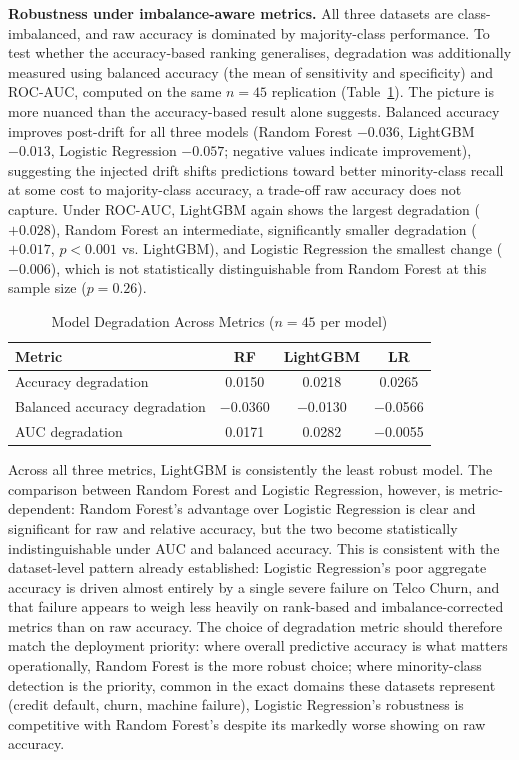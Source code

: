 \documentclass[conference]{IEEEtran}
\begin{document}
\textbf{Robustness under imbalance-aware metrics.} All three datasets are class-imbalanced, and raw accuracy is dominated by majority-class performance. To test whether the accuracy-based ranking generalises, degradation was additionally measured using balanced accuracy (the mean of sensitivity and specificity) and ROC-AUC, computed on the same $n=45$ replication (Table~\ref{tab:modelmetrics}). The picture is more nuanced than the accuracy-based result alone suggests. Balanced accuracy improves post-drift for all three models (Random Forest $-0.036$, LightGBM $-0.013$, Logistic Regression $-0.057$; negative values indicate improvement), suggesting the injected drift shifts predictions toward better minority-class recall at some cost to majority-class accuracy, a trade-off raw accuracy does not capture. Under ROC-AUC, LightGBM again shows the largest degradation ($+0.028$), Random Forest an intermediate, significantly smaller degradation ($+0.017$, $p<0.001$ vs. LightGBM), and Logistic Regression the smallest change ($-0.006$), which is not statistically distinguishable from Random Forest at this sample size ($p=0.26$).

\begin{table}[htbp]
\caption{Model Degradation Across Metrics ($n=45$ per model)}
\label{tab:modelmetrics}
\centering
\begin{tabular}{lccc}
\toprule
Metric & RF & LightGBM & LR \\
\midrule
Accuracy degradation           & 0.0150  & 0.0218  & 0.0265 \\
Balanced accuracy degradation  & $-$0.0360 & $-$0.0130 & $-$0.0566 \\
AUC degradation                & 0.0171  & 0.0282  & $-$0.0055 \\
\bottomrule
\end{tabular}
\end{table}

Across all three metrics, LightGBM is consistently the least robust model. The comparison between Random Forest and Logistic Regression, however, is metric-dependent: Random Forest's advantage over Logistic Regression is clear and significant for raw and relative accuracy, but the two become statistically indistinguishable under AUC and balanced accuracy. This is consistent with the dataset-level pattern already established: Logistic Regression's poor aggregate accuracy is driven almost entirely by a single severe failure on Telco Churn, and that failure appears to weigh less heavily on rank-based and imbalance-corrected metrics than on raw accuracy. The choice of degradation metric should therefore match the deployment priority: where overall predictive accuracy is what matters operationally, Random Forest is the more robust choice; where minority-class detection is the priority, common in the exact domains these datasets represent (credit default, churn, machine failure), Logistic Regression's robustness is competitive with Random Forest's despite its markedly worse showing on raw accuracy.
\end{document}
